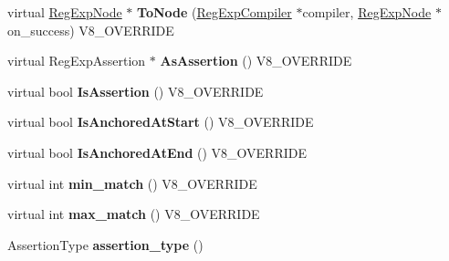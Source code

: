 \begin{DoxyCompactItemize}
\item 
\hypertarget{classv8_1_1internal_1_1_v8___f_i_n_a_l_aa183d4adede0c6af0c092eeebf59c194}{}virtual \hyperlink{classv8_1_1internal_1_1_reg_exp_node}{Reg\+Exp\+Node} $\ast$ {\bfseries To\+Node} (\hyperlink{classv8_1_1internal_1_1_reg_exp_compiler}{Reg\+Exp\+Compiler} $\ast$compiler, \hyperlink{classv8_1_1internal_1_1_reg_exp_node}{Reg\+Exp\+Node} $\ast$on\+\_\+success) V8\+\_\+\+O\+V\+E\+R\+R\+I\+D\+E\label{classv8_1_1internal_1_1_v8___f_i_n_a_l_aa183d4adede0c6af0c092eeebf59c194}

\item 
\hypertarget{classv8_1_1internal_1_1_v8___f_i_n_a_l_a32a30f2b7c1d7bc4f21dfe93089b69e0}{}virtual Reg\+Exp\+Assertion $\ast$ {\bfseries As\+Assertion} () V8\+\_\+\+O\+V\+E\+R\+R\+I\+D\+E\label{classv8_1_1internal_1_1_v8___f_i_n_a_l_a32a30f2b7c1d7bc4f21dfe93089b69e0}

\item 
\hypertarget{classv8_1_1internal_1_1_v8___f_i_n_a_l_acf321c1e1f9f533dc3644bc1458e2a6a}{}virtual bool {\bfseries Is\+Assertion} () V8\+\_\+\+O\+V\+E\+R\+R\+I\+D\+E\label{classv8_1_1internal_1_1_v8___f_i_n_a_l_acf321c1e1f9f533dc3644bc1458e2a6a}

\item 
\hypertarget{classv8_1_1internal_1_1_v8___f_i_n_a_l_a1303853ed1afec044f4a5c65f06e977b}{}virtual bool {\bfseries Is\+Anchored\+At\+Start} () V8\+\_\+\+O\+V\+E\+R\+R\+I\+D\+E\label{classv8_1_1internal_1_1_v8___f_i_n_a_l_a1303853ed1afec044f4a5c65f06e977b}

\item 
\hypertarget{classv8_1_1internal_1_1_v8___f_i_n_a_l_af12a212dba3f2fafc3dc142311b35977}{}virtual bool {\bfseries Is\+Anchored\+At\+End} () V8\+\_\+\+O\+V\+E\+R\+R\+I\+D\+E\label{classv8_1_1internal_1_1_v8___f_i_n_a_l_af12a212dba3f2fafc3dc142311b35977}

\item 
\hypertarget{classv8_1_1internal_1_1_v8___f_i_n_a_l_ac4abdb29d336dc24ef96695ac805b1ac}{}virtual int {\bfseries min\+\_\+match} () V8\+\_\+\+O\+V\+E\+R\+R\+I\+D\+E\label{classv8_1_1internal_1_1_v8___f_i_n_a_l_ac4abdb29d336dc24ef96695ac805b1ac}

\item 
\hypertarget{classv8_1_1internal_1_1_v8___f_i_n_a_l_a0b9dd74bfd4f1172c26a072c44da8669}{}virtual int {\bfseries max\+\_\+match} () V8\+\_\+\+O\+V\+E\+R\+R\+I\+D\+E\label{classv8_1_1internal_1_1_v8___f_i_n_a_l_a0b9dd74bfd4f1172c26a072c44da8669}

\item 
\hypertarget{classv8_1_1internal_1_1_v8___f_i_n_a_l_aa607e44388c96ca39a43ff495dc3de61}{}Assertion\+Type {\bfseries assertion\+\_\+type} ()\label{classv8_1_1internal_1_1_v8___f_i_n_a_l_aa607e44388c96ca39a43ff495dc3de61}


\end{DoxyCompactItemize}

